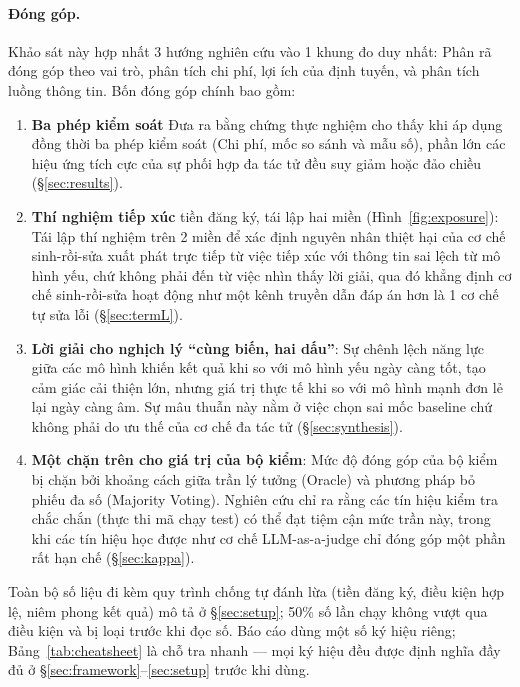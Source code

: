 \documentclass[11pt,a4paper]{article}
\begin{document}
\paragraph{Đóng góp.} Khảo sát này hợp nhất 3 hướng nghiên cứu vào 1 khung đo duy nhất: Phân rã đóng góp theo vai trò, phân tích chi phí, lợi ích của định tuyến, và phân tích luồng thông tin. Bốn đóng góp chính bao gồm:
\begin{enumerate}\itemsep2pt
  \item \textbf{Ba phép kiểm soát} Đưa ra bằng chứng thực nghiệm cho thấy khi áp dụng đồng thời ba phép kiểm soát (Chi phí, mốc so sánh và mẫu số), phần lớn các hiệu ứng tích cực của sự phối hợp đa tác tử đều suy giảm hoặc đảo chiều (\S\ref{sec:results}).
  \item \textbf{Thí nghiệm tiếp xúc} tiền đăng ký, tái lập hai miền (Hình~\ref{fig:exposure}): Tái lập thí nghiệm trên 2 miền để xác định nguyên nhân thiệt hại của cơ chế sinh-rồi-sửa xuất phát trực tiếp từ việc tiếp xúc với thông tin sai lệch từ mô hình yếu, chứ không phải đến từ việc nhìn thấy lời giải, qua đó khẳng định cơ chế sinh-rồi-sửa hoạt động như một kênh truyền dẫn đáp án hơn là 1 cơ chế tự sửa lỗi (\S\ref{sec:termL}).
  \item \textbf{Lời giải cho nghịch lý ``cùng biến, hai dấu''}: Sự chênh lệch năng lực giữa các mô hình khiến kết quả khi so với mô hình yếu ngày càng tốt, tạo cảm giác cải thiện lớn, nhưng giá trị thực tế khi so với mô hình mạnh đơn lẻ lại ngày càng âm. Sự mâu thuẫn này nằm ở việc chọn sai mốc baseline chứ không phải do ưu thế của cơ chế đa tác tử (\S\ref{sec:synthesis}).
  \item \textbf{Một chặn trên cho giá trị của bộ kiểm}: Mức độ đóng góp của bộ kiểm bị chặn bởi khoảng cách giữa trần lý tưởng (Oracle) và phương pháp bỏ phiếu đa số (Majority Voting). Nghiên cứu chỉ ra rằng các tín hiệu kiểm tra chắc chắn (thực thi mã chạy test) có thể đạt tiệm cận mức trần này, trong khi các tín hiệu học được như cơ chế LLM-as-a-judge chỉ đóng góp một phần rất hạn chế (\S\ref{sec:kappa}).
\end{enumerate}
Toàn bộ số liệu đi kèm quy trình chống tự đánh lừa (tiền đăng ký, điều kiện hợp lệ, niêm phong
kết quả) mô tả ở \S\ref{sec:setup}; 50\% số lần chạy không vượt qua điều kiện và bị loại trước
khi đọc số. Báo cáo dùng một số ký hiệu riêng; Bảng~\ref{tab:cheatsheet} là chỗ tra nhanh ---
mọi ký hiệu đều được định nghĩa đầy đủ ở \S\ref{sec:framework}--\ref{sec:setup} trước khi
dùng.
\end{document}
